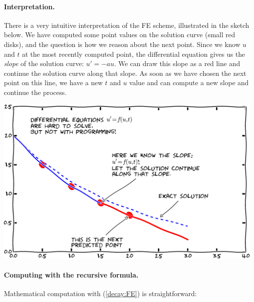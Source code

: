 \documentclass[%
oneside,                 %
final,                   %
10pt]{article}
\begin{document}
\paragraph{Interpretation.}
There is a very intuitive interpretation of the FE scheme, illustrated
in the sketch below. We have computed some point values
on the solution curve (small red disks), and the question is how we reason
about the next point. Since we know $u$ and $t$ at the most recently
computed point, the differential equation gives us the \emph{slope} of
the solution curve: $u'=-au$. We can draw this slope as a red line
and continue the solution curve along that slope. As soon as we have
chosen the next point on this line, we have a new $t$ and $u$ value and
can compute a new slope and continue the process.



\vspace{3mm}




\vspace{3mm}





\centerline{\includegraphics[width=0.8\linewidth]{fig-alg/FE_idea.pdf}}





\vspace{3mm}




\vspace{3mm}



\paragraph{Computing with the recursive formula.}
Mathematical computation with (\ref{decay:FE}) is straightforward:
\end{document}
